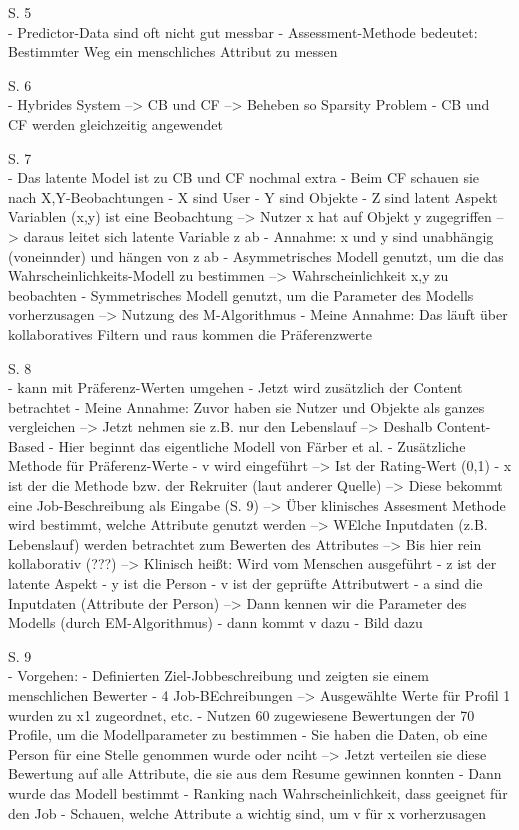 S. 5\\
- Predictor-Data sind oft nicht gut messbar
- Assessment-Methode bedeutet: Bestimmter Weg ein menschliches Attribut zu messen

S. 6\\
- Hybrides System --> CB und CF --> Beheben so Sparsity Problem
- CB und CF werden gleichzeitig angewendet

S. 7\\
- Das latente Model ist zu CB und CF nochmal extra
- Beim CF schauen sie nach X,Y-Beobachtungen
- X sind User
- Y sind Objekte
- Z sind latent Aspekt Variablen
(x,y) ist eine Beobachtung --> Nutzer x hat auf Objekt y zugegriffen --> daraus leitet sich latente Variable z ab
- Annahme: x und y sind unabhängig (voneinnder) und hängen von z ab
- Asymmetrisches Modell genutzt, um die das Wahrscheinlichkeits-Modell zu bestimmen --> Wahrscheinlichkeit x,y zu beobachten
- Symmetrisches Modell genutzt, um die Parameter des Modells vorherzusagen --> Nutzung des M-Algorithmus
- Meine Annahme: Das läuft über kollaboratives Filtern und raus kommen die Präferenzwerte

S. 8\\
- kann mit Präferenz-Werten umgehen
- Jetzt wird zusätzlich der Content betrachtet
- Meine Annahme: Zuvor haben sie Nutzer und Objekte als ganzes vergleichen --> Jetzt nehmen sie z.B. nur den Lebenslauf --> Deshalb Content-Based
- Hier beginnt das eigentliche Modell von Färber et al.
- Zusätzliche Methode für Präferenz-Werte
- v wird eingeführt --> Ist der Rating-Wert (0,1)
- x ist der die Methode bzw. der Rekruiter (laut anderer Quelle) --> Diese bekommt eine Job-Beschreibung als Eingabe (S. 9) --> Über klinisches Assesment Methode wird bestimmt, welche Attribute genutzt werden --> WElche Inputdaten (z.B. Lebenslauf) werden betrachtet zum Bewerten des Attributes --> Bis hier rein kollaborativ (???) --> Klinisch heißt: Wird vom Menschen ausgeführt
- z ist der latente Aspekt
- y ist die Person
- v ist der geprüfte Attributwert
- a sind die Inputdaten (Attribute der Person)
--> Dann kennen wir die Parameter des Modells (durch EM-Algorithmus)
- dann kommt v dazu
- Bild dazu

S. 9\\
- Vorgehen:
- Definierten Ziel-Jobbeschreibung und zeigten sie einem menschlichen Bewerter
- 4 Job-BEchreibungen --> Ausgewählte Werte für Profil 1 wurden zu x1 zugeordnet, etc.
- Nutzen 60 zugewiesene Bewertungen der 70 Profile, um die Modellparameter zu bestimmen
- Sie haben die Daten, ob eine Person für eine Stelle genommen wurde oder nciht --> Jetzt verteilen sie diese Bewertung auf alle Attribute, die sie aus dem Resume gewinnen konnten
- Dann wurde das Modell bestimmt
- Ranking nach Wahrscheinlichkeit, dass geeignet für den Job
- Schauen, welche Attribute a wichtig sind, um v für x vorherzusagen

